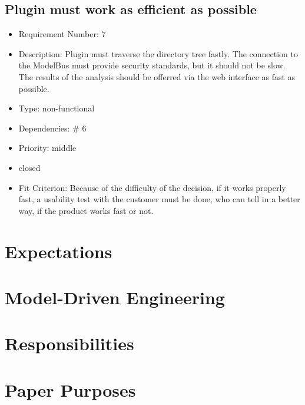 \subsection{Plugin must work as efficient as possible}
\begin{itemize}
\item Requirement Number: 7
\item Description: Plugin must traverse the directory tree fastly. The connection to the ModelBus must provide security standards, but it should not be slow. The results of the analysis should be offerred via the web interface as fast as possible.
\item Type: non-functional
\item Dependencies: \# 6
\item Priority: middle
\item closed
\item Fit Criterion: Because of the difficulty of the decision, if it works properly fast, a usability test with the customer must be done, who can tell in a better way, if the product works fast or not.
\end{itemize}

\section{Expectations}


\section{Model-Driven Engineering}


\section{Responsibilities}


\section{Paper Purposes}
